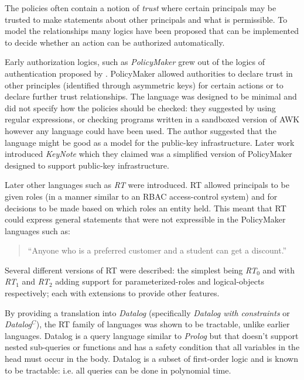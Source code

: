 \documentclass[a4paper,sfsidenotes]{tufte-book}
\begin{document}
The policies often contain a notion of \emph{trust} where certain principals
may be trusted to make statements about other principals and what is
permissible. To model the relationships many logics have been proposed that can
be implemented to decide whether an action can be authorized automatically.

Early authorization logics, such as \emph{PolicyMaker}\cite{Blaze:dj} grew out
of the logics of authentication proposed by
\citeauthor*{Wobber:1994dh}\cite{Lampson:1992jg}\cite{Wobber:1994dh}.
PolicyMaker allowed authorities to declare trust in other principles (identified
through asymmetric keys) for certain actions or to declare further trust
relationships. The language was designed to be minimal and did not specify how
the policies should be checked: they suggested by using regular expressions, or
checking programs written in a sandboxed version of AWK however any language
could have been used. The author suggested that the language might be good as a
model for the public-key infrastructure. Later work introduced
\emph{KeyNote}\cite{Blaze:1999fa} which they claimed was a simplified version of
PolicyMaker designed to support public-key infrastructure.

Later other languages such as \emph{RT}\cite{Li:2002if} were introduced. RT
allowed principals to be given roles (in a manner similar to an \ac{RBAC}
access-control system) and for decisions to be made based on which roles an
entity held. This meant that RT could express general statements that were not
expressible in the PolicyMaker languages such as:
\begin{quote}
  ``Anyone who is a preferred customer and a student can get a discount.''
\end{quote}
Several different versions of RT were described: the simplest being
\emph{RT$_0$}\cite{Li:2003tj} and with \emph{RT$_1$} and \emph{RT$_2$} adding support for
parameterized-roles and logical-objects respectively; each with extensions to
provide other features.

By providing a translation into \emph{Datalog} (specifically \emph{Datalog with
  constraints} or \emph{Datalog$^C$\cite{Li:2003ix}}), the RT family of
languages was shown to be tractable, unlike earlier languages. Datalog is a
query language similar to \emph{Prolog} but that doesn't support nested
sub-queries or functions and has a safety condition that all variables in
the head must occur in the body. Datalog is a subset of first-order logic
and is known to be tractable: i{.}e{.} all queries can be done in polynomial
time.
\end{document}

